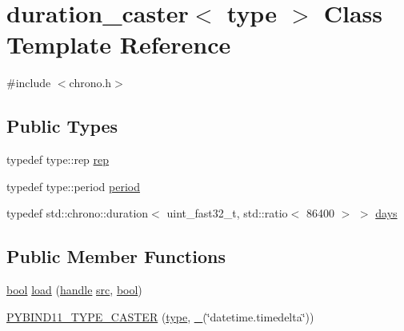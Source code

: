 \hypertarget{classduration__caster}{}\section{duration\+\_\+caster$<$ type $>$ Class Template Reference}
\label{classduration__caster}


{\ttfamily \#include $<$chrono.\+h$>$}

\subsection*{Public Types}
\begin{DoxyCompactItemize}
\item 
typedef type\+::rep \mbox{\hyperlink{classduration__caster_aa56a3f1e4b4c1651fbe0b52f9575e1bd}{rep}}
\item 
typedef type\+::period \mbox{\hyperlink{classduration__caster_ac22f4732d7e0b975d5c5d2e82a7635c4}{period}}
\item 
typedef std\+::chrono\+::duration$<$ uint\+\_\+fast32\+\_\+t, std\+::ratio$<$ 86400 $>$ $>$ \mbox{\hyperlink{classduration__caster_a04fee4c68761f22d238c731c4a89e150}{days}}
\end{DoxyCompactItemize}
\subsection*{Public Member Functions}
\begin{DoxyCompactItemize}
\item 
\mbox{\hyperlink{asdl_8h_af6a258d8f3ee5206d682d799316314b1}{bool}} \mbox{\hyperlink{classduration__caster_ac5394869ec7d87be76a8cd574d76f3a4}{load}} (\mbox{\hyperlink{classhandle}{handle}} \mbox{\hyperlink{_s_d_l__opengl__glext_8h_a72e0fdf0f845ded60b1fada9e9195cd7}{src}}, \mbox{\hyperlink{asdl_8h_af6a258d8f3ee5206d682d799316314b1}{bool}})
\item 
\mbox{\hyperlink{classduration__caster_a3518d09fefb62b0be79c37d79c298822}{P\+Y\+B\+I\+N\+D11\+\_\+\+T\+Y\+P\+E\+\_\+\+C\+A\+S\+T\+ER}} (\mbox{\hyperlink{_s_d_l__opengl_8h_ad5ddf6fca7b585646515660e810e0188}{type}}, \mbox{\hyperlink{descr_8h_af114703e20c6527e87163eb2798f74b8}{\+\_\+}}(\char`\"{}datetime.\+timedelta\char`\"{}))
\end{DoxyCompactItemize}
